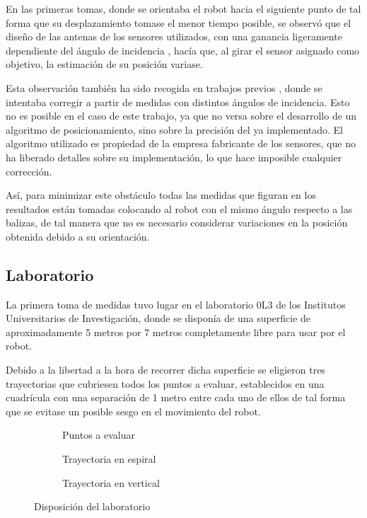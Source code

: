 En las primeras tomas, donde se orientaba el robot hacia el siguiente punto de tal forma que su desplazamiento tomase el menor tiempo posible, se observó que el diseño de las antenas de los sensores utilizados, con una ganancia ligeramente dependiente del ángulo de incidencia \cite{ang}, hacía que, al girar el sensor asignado como objetivo, la estimación de su posición variase.

Esta observación también ha sido recogida en trabajos previos \cite{MSTesis}, donde se intentaba corregir a partir de medidas con distintos ángulos de incidencia.
Esto no es posible en el caso de este trabajo, ya que no versa sobre el desarrollo de un algoritmo de posicionamiento, sino sobre la precisión del ya implementado.
El algoritmo utilizado es propiedad de la empresa fabricante de los sensores, que no ha liberado detalles sobre su implementación, lo que hace imposible cualquier corrección.

Así, para minimizar este obstáculo todas las medidas que figuran en los resultados están tomadas colocando al robot con el mismo ángulo respecto a las balizas, de tal manera que no es necesario considerar variaciones en la posición obtenida debido a su orientación.

\subsection{Laboratorio}

La primera toma de medidas tuvo lugar en el laboratorio 0L3 de los Institutos Universitarios de Investigación, donde se disponía de una superficie de aproximadamente 5 metros por 7 metros completamente libre para usar por el robot.

Debido a la libertad a la hora de recorrer dicha superficie se eligieron tres trayectorias que cubriesen todos los puntos a evaluar, establecidos en una cuadrícula con una separación de 1 metro entre cada uno de ellos de tal forma que se evitase un posible sesgo en el movimiento del robot.

\begin{figure}[H]
    \begin{subfigure}[b]{.3\textwidth}
      \centering
      \def\svgwidth{0.8\linewidth}
	     
      \caption{Puntos a evaluar}
      \label{fig:puntos}
    \end{subfigure}
    \begin{subfigure}[b]{.3\textwidth}
      \centering
      \def\svgwidth{0.8\linewidth}
	     
      \caption{Trayectoria en espiral}
      \label{fig:espiral}
    \end{subfigure}
    \begin{subfigure}[b]{.3\textwidth}
        \centering
        \def\svgwidth{0.8\linewidth}
	     
        \caption{Trayectoria en vertical}
        \label{fig:vertical}
      \end{subfigure}
    \caption{Disposición del laboratorio}
    \label{fig:laboratorio}
\end{figure}

